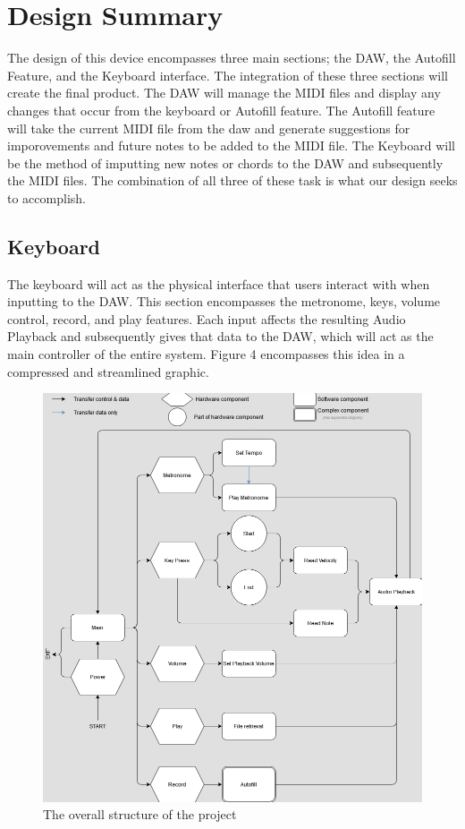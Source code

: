 \section{Design Summary}

The design of this device encompasses three main sections; the DAW, the Autofill Feature,
and the Keyboard interface. The integration of these three sections will create the final
product. The DAW will manage the MIDI files and display any changes that occur from the
keyboard or Autofill feature. The Autofill feature will take the current MIDI file from
the daw and generate suggestions for imporovements and future notes to be added to the
MIDI file. The Keyboard will be the method of imputting new notes or chords to the DAW and
subsequently the MIDI files. The combination of all three of these task is what our design
seeks to accomplish.

\subsection{Keyboard}

The keyboard will act as the physical interface that users interact with when inputting to
the DAW. This section encompasses the metronome, keys, volume control, record, and play
features. Each input affects the resulting Audio Playback and subsequently gives that data
to the DAW, which will act as the main controller of the entire system. Figure 4
encompasses this idea in a compressed and streamlined graphic.

\begin{figure}[h!]
  \centering
  \includegraphics[width=\linewidth]{image/Keyboard.png}
  \caption{The overall structure of the project}
  \label{fig:keyboard_diagram}
\end{figure}

